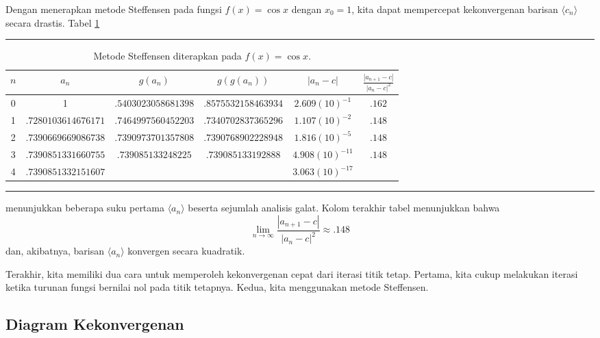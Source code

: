 Dengan menerapkan metode Steffensen pada fungsi $f(x)=\cos x$ dengan
$x_{0}=1$, kita dapat mempercepat kekonvergenan barisan $\langle c_{n}\rangle$
secara drastis. Tabel \ref{tab:steffensens2} 
\begin{table}
\hrule 

\caption{\label{tab:steffensens2}Metode Steffensen diterapkan pada $f(x)=\cos x$.}
\medskip{}

\begin{centering}
\begin{tabular}{c|ccccc}
$n$ & $a_{n}$ & $g(a_{n})$ & $g(g(a_{n}))$ & $|a_{n}-c|$ & $\frac{\left|a_{n+1}-c\right|}{\left|a_{n}-c\right|^{2}}$\tabularnewline
\hline 
0 & 1 & $.5403023058681398$ & $.8575532158463934$ & $2.609(10)^{-1}$ & $.162$\tabularnewline
1 & $.7280103614676171$ & $.7464997560452203$ & $.7340702837365296$ & $1.107(10)^{-2}$ & $.148$\tabularnewline
2 & $.7390669669086738$ & $.7390973701357808$ & $.7390768902228948$ & $1.816(10)^{-5}$ & $.148$\tabularnewline
3 & $.7390851331660755$ & $.739085133248225$ & $.739085133192888$ & $4.908(10)^{-11}$ & $.148$\tabularnewline
4 & $.7390851332151607$ &  &  & $3.063(10)^{-17}$ & \tabularnewline
\end{tabular}
\par\end{centering}
\medskip{}
\hrule 
\end{table}
 menunjukkan beberapa suku pertama $\langle a_{n}\rangle$ beserta
sejumlah analisis galat. Kolom terakhir tabel menunjukkan bahwa 
\[
\lim_{n\to\infty}\frac{\left|a_{n+1}-c\right|}{\left|a_{n}-c\right|^{2}}\approx.148
\]
dan, akibatnya, barisan $\langle a_{n}\rangle$ konvergen secara kuadratik.

Terakhir, kita memiliki dua cara untuk memperoleh kekonvergenan cepat
dari iterasi titik tetap. Pertama, kita cukup melakukan iterasi ketika
turunan fungsi bernilai nol pada titik tetapnya. Kedua, kita menggunakan
metode Steffensen.

\subsection{Diagram Kekonvergenan}

